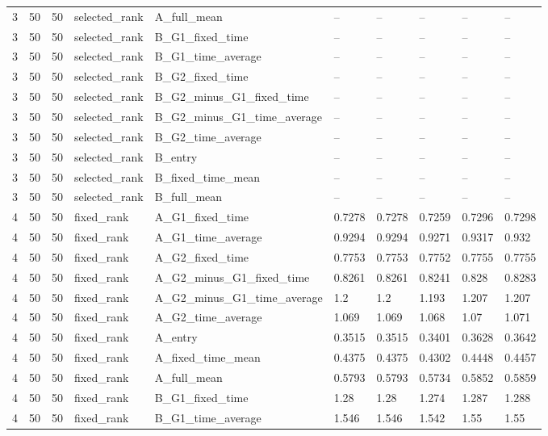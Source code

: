 \begin{longtable}{llllllllll}
3 & 50 & 50 & selected\_rank & A\_full\_mean & -- & -- & -- & -- & -- \\
3 & 50 & 50 & selected\_rank & B\_G1\_fixed\_time & -- & -- & -- & -- & -- \\
3 & 50 & 50 & selected\_rank & B\_G1\_time\_average & -- & -- & -- & -- & -- \\
3 & 50 & 50 & selected\_rank & B\_G2\_fixed\_time & -- & -- & -- & -- & -- \\
3 & 50 & 50 & selected\_rank & B\_G2\_minus\_G1\_fixed\_time & -- & -- & -- & -- & -- \\
3 & 50 & 50 & selected\_rank & B\_G2\_minus\_G1\_time\_average & -- & -- & -- & -- & -- \\
3 & 50 & 50 & selected\_rank & B\_G2\_time\_average & -- & -- & -- & -- & -- \\
3 & 50 & 50 & selected\_rank & B\_entry & -- & -- & -- & -- & -- \\
3 & 50 & 50 & selected\_rank & B\_fixed\_time\_mean & -- & -- & -- & -- & -- \\
3 & 50 & 50 & selected\_rank & B\_full\_mean & -- & -- & -- & -- & -- \\
4 & 50 & 50 & fixed\_rank & A\_G1\_fixed\_time & 0.7278 & 0.7278 & 0.7259 & 0.7296 & 0.7298 \\
4 & 50 & 50 & fixed\_rank & A\_G1\_time\_average & 0.9294 & 0.9294 & 0.9271 & 0.9317 & 0.932 \\
4 & 50 & 50 & fixed\_rank & A\_G2\_fixed\_time & 0.7753 & 0.7753 & 0.7752 & 0.7755 & 0.7755 \\
4 & 50 & 50 & fixed\_rank & A\_G2\_minus\_G1\_fixed\_time & 0.8261 & 0.8261 & 0.8241 & 0.828 & 0.8283 \\
4 & 50 & 50 & fixed\_rank & A\_G2\_minus\_G1\_time\_average & 1.2 & 1.2 & 1.193 & 1.207 & 1.207 \\
4 & 50 & 50 & fixed\_rank & A\_G2\_time\_average & 1.069 & 1.069 & 1.068 & 1.07 & 1.071 \\
4 & 50 & 50 & fixed\_rank & A\_entry & 0.3515 & 0.3515 & 0.3401 & 0.3628 & 0.3642 \\
4 & 50 & 50 & fixed\_rank & A\_fixed\_time\_mean & 0.4375 & 0.4375 & 0.4302 & 0.4448 & 0.4457 \\
4 & 50 & 50 & fixed\_rank & A\_full\_mean & 0.5793 & 0.5793 & 0.5734 & 0.5852 & 0.5859 \\
4 & 50 & 50 & fixed\_rank & B\_G1\_fixed\_time & 1.28 & 1.28 & 1.274 & 1.287 & 1.288 \\
4 & 50 & 50 & fixed\_rank & B\_G1\_time\_average & 1.546 & 1.546 & 1.542 & 1.55 & 1.55 \\

\end{longtable}
